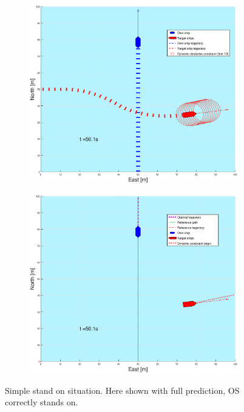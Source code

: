 \begin{figure}[ht!]
\begin{subfigure}[b]{0.499\textwidth}
    \end{subfigure}
    \hfill
    \\
    \begin{subfigure}[b]{0.49\textwidth}
        \centering
        \includegraphics[width=\textwidth]{Images/Figures/enkel_SO/_Simple_0fig1_time=50}
    \end{subfigure}
    \hfill
    \begin{subfigure}[b]{0.499\textwidth}
        \centering
        \includegraphics[width=\textwidth]{Images/Figures/enkel_SO/_Simple_0fig999_time=50}
    \end{subfigure}
    \hfill
    \caption{Simple stand on situation. Here shown with full prediction, \gls{OS} correctly stands on.}
\end{figure}%

